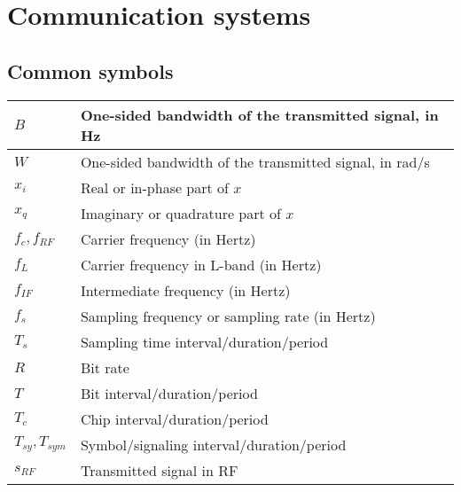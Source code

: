 \documentclass{article}
\begin{document}
\section{Communication systems}
\subsection{Common symbols}
\begin{xltabular}{\textwidth}{XX}
	\(B\)                 & One-sided bandwidth of the transmitted signal, in Hz                              \\ \hline
	\(W\)                 & One-sided bandwidth of the transmitted signal, in rad/s                           \\ \hline
	\(x_i\)               & Real or in-phase part of \(x\)                                                    \\ \hline
	\(x_q\)               & Imaginary or quadrature part of \(x\)                                             \\ \hline
	\(f_c, f_{RF}\)       & Carrier frequency (in Hertz)                                                      \\ \hline
	\(f_L\)               & Carrier frequency in L-band (in Hertz)                                            \\ \hline
	\(f_{IF}\)            & Intermediate frequency (in Hertz)                                                 \\ \hline
	\(f_{s}\)             & Sampling frequency or sampling rate (in Hertz)                                    \\ \hline
	\(T_{s}\)             & Sampling time interval/duration/period                                            \\ \hline
	\(R\)                 & Bit rate                                                                          \\ \hline
	\(T\)                 & Bit interval/duration/period                                                      \\ \hline
	\(T_c\)               & Chip interval/duration/period                                                     \\ \hline
	\(T_{sy}, T_{sym}\)   & Symbol/signaling\cite{proakisDigitalCommunications2007} interval/duration/period  \\ \hline
	\(s_{RF}\)            & Transmitted signal in RF                                                          \\ \hline

\end{xltabular}
\end{document}
